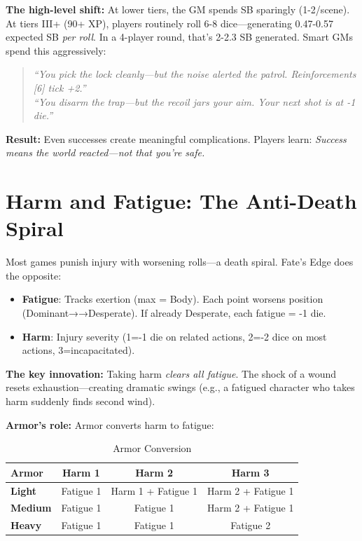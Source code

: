 \documentclass[11pt]{article}
\begin{document}
\textbf{The high-level shift:} At lower tiers, the GM spends SB sparingly (1-2/scene). At tiers III+ (90+ XP), players routinely roll 6-8 dice—generating 0.47-0.57 expected SB \textit{per roll}. In a 4-player round, that's 2-2.3 SB generated. Smart GMs spend this aggressively:
\begin{quote}
    \textit{``You pick the lock cleanly—but the noise alerted the patrol. Reinforcements [6] tick +2.''} \\
    \textit{``You disarm the trap—but the recoil jars your aim. Your next shot is at -1 die.''}
\end{quote}
\textbf{Result:} Even successes create meaningful complications. Players learn: \textit{Success means the world reacted—not that you're safe.}

\section{Harm and Fatigue: The Anti-Death Spiral}

Most games punish injury with worsening rolls—a death spiral. Fate's Edge does the opposite:

\begin{itemize}
    \item \textbf{Fatigue}: Tracks exertion (max = Body). Each point worsens position (Dominant→→Desperate). If already Desperate, each fatigue = -1 die.
    \item \textbf{Harm}: Injury severity (1=-1 die on related actions, 2=-2 dice on most actions, 3=incapacitated).
\end{itemize}

\textbf{The key innovation:} Taking harm \textit{clears all fatigue}. The shock of a wound resets exhaustion—creating dramatic swings (e.g., a fatigued character who takes harm suddenly finds second wind).

\textbf{Armor's role:} Armor converts harm to fatigue:

\begin{table}[h]
\centering
\caption{Armor Conversion}
\begin{tabular}{>{\bfseries}l ccc}
\toprule
Armor & Harm 1 & Harm 2 & Harm 3 \\
\midrule
Light & Fatigue 1 & Harm 1 + Fatigue 1 & Harm 2 + Fatigue 1 \\
Medium & Fatigue 1 & Fatigue 1 & Harm 2 + Fatigue 1 \\
Heavy & Fatigue 1 & Fatigue 1 & Fatigue 2 \\
\bottomrule
\end{tabular}
\end{table}
\end{document}
